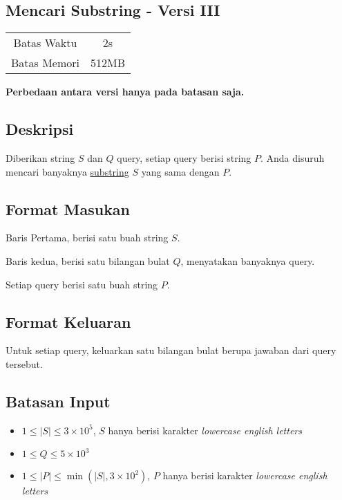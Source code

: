 \documentclass{article}
\begin{document}
\begin{center}
    \section*{Mencari Substring - Versi III} %

    \begin{tabular}{ | c c | }
        \hline
        Batas Waktu  & 2s \\    %
        Batas Memori & 512MB \\  %
        \hline
    \end{tabular}
\end{center}

\begin{center}
    \textbf{Perbedaan antara versi hanya pada batasan saja.}
\end{center}

\subsection*{Deskripsi}

Diberikan string $S$ dan $Q$ query, setiap query berisi string $P$. Anda disuruh mencari banyaknya \href{https://en.wikipedia.org/wiki/Substring}{substring} $S$ yang sama dengan $P$.

\subsection*{Format Masukan}
Baris Pertama, berisi satu buah string $S$.

Baris kedua, berisi satu bilangan bulat $Q$, menyatakan banyaknya query.

Setiap query berisi satu buah string $P$.

\subsection*{Format Keluaran}
Untuk setiap query, keluarkan satu bilangan bulat berupa jawaban dari query tersebut.

\subsection*{Batasan Input}

\begin{itemize}
    \item{$1 \leq |S| \leq 3 \times 10^5$, $S$ hanya berisi karakter \textit{lowercase english letters}}
    \item{$1 \leq Q \leq 5 \times 10^3$}
    \item{$1 \leq |P| \leq \min(|S|, 3 \times 10^2)$, $P$ hanya berisi karakter \textit{lowercase english letters}}
\end{itemize}
\end{document}
